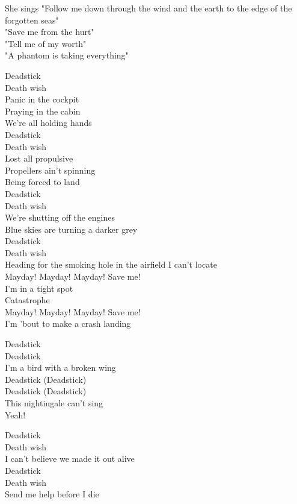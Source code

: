 She sings "Follow me down through the wind and the earth to the edge of the forgotten seas"\\
"Save me from the hurt"\\
"Tell me of my worth"\\
"A phantom is taking everything"\\


Deadstick\\
Death wish\\
Panic in the cockpit\\
Praying in the cabin\\
We're all holding hands\\
Deadstick\\
Death wish\\
Lost all propulsive\\
Propellers ain't spinning\\
Being forced to land\\
Deadstick\\
Death wish\\
We're shutting off the engines\\
Blue skies are turning a darker grey\\
Deadstick\\
Death wish\\
Heading for the smoking hole in the airfield I can't locate\\

Mayday! Mayday! Mayday! Save me!\\
I'm in a tight spot\\
Catastrophe\\
Mayday! Mayday! Mayday! Save me!\\
I'm 'bout to make a crash landing\\


Deadstick\\
Deadstick\\
I'm a bird with a broken wing\\
Deadstick (Deadstick)\\
Deadstick (Deadstick)\\
This nightingale can't sing\\
Yeah!\\


Deadstick\\
Death wish\\
I can't believe we made it out alive\\
Deadstick\\
Death wish\\
Send me help before I die\\


